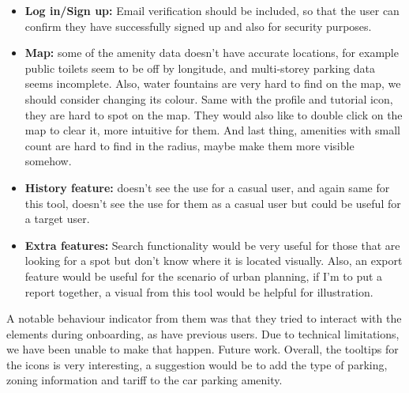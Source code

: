 \begin{itemize}
    \item \textbf{Log in/Sign up: }Email verification should be included, so
    that the user can confirm they have successfully signed up and also for
    security purposes.
    \vspace{0.2cm}

    \item \textbf{Map: }some of the amenity data doesn't have accurate
    locations, for example public toilets seem to be off by longitude, and
    multi-storey parking data seems incomplete. Also, water fountains are very
    hard to find on the map, we should consider changing its colour. Same with
    the profile and tutorial icon, they are hard to spot on the map. They would
    also like to double click on the map to clear it, more intuitive for them.
    And last thing, amenities with small count are hard to find in the radius,
    maybe make them more visible somehow.
    \vspace{0.2cm}

    \item \textbf{History feature: }doesn't see the use for a casual user, and
    again same for this tool, doesn't see the use for them as a casual user but
    could be useful for a target user.
    \vspace{0.2cm}

    \item \textbf{Extra features: }Search functionality would be very useful for
    those that are looking for a spot but don't know where it is located
    visually. Also, an export feature would be useful for the scenario of urban
    planning, if I'm to put a report together, a visual from this tool would be
    helpful for illustration.
\end{itemize}

A notable behaviour indicator from them was that they tried to interact with the
elements during onboarding, as have previous users. Due to technical
limitations, we have been unable to make that happen. Future work.
Overall, the tooltips for the icons is very interesting, a suggestion would be
to add the type of parking, zoning information and tariff to the car parking
amenity.

